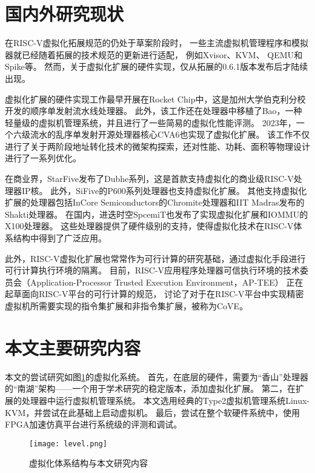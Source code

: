 \section{国内外研究现状}
在RISC-V虚拟化拓展规范的仍处于草案阶段时，
一些主流虚拟机管理程序和模拟器就已经随着拓展的技术规范的更新进行适配，
例如Xvisor\cite{pdp2015xvisor}、KVM\cite{kvm:H-ext}、
QEMU\cite{qemu-riscv:H-ext}和Spike\cite{github:spike}等。
然而，关于虚拟化扩展的硬件实现，仅从拓展的0.6.1版本发布后才陆续出现。

虚拟化扩展的硬件实现工作最早开展在Rocket Chip\cite{itco2022rocket}中，这是加州大学伯克利分校开发的顺序单发射流水线处理器。
此外，该工作还在处理器中移植了Bao，一种轻量级的虚拟机管理系统\cite{ng-res2020bao}，并且进行了一些简易的虚拟化性能评测。
2023年，一个六级流水的乱序单发射开源处理器核心CVA6\cite{tvlsi2023cva6}也实现了虚拟化扩展。
该工作不仅进行了关于两阶段地址转化技术的微架构探索，还对性能、功耗、面积等物理设计进行了一系列优化。

在商业界，StarFive发布了Dubhe系列，这是首款支持虚拟化的商业级RISC-V处理器IP核。
此外，SiFive的P600系列处理器也支持虚拟化扩展。
其他支持虚拟化扩展的处理器包括InCore Semiconductors的Chromite处理器和IIT Madras发布的Shakti处理器。
在国内，进迭时空SpcemiT也发布了实现虚拟化扩展和IOMMU的X100处理器。
这些处理器提供了硬件级别的支持，使得虚拟化技术在RISC-V体系结构中得到了广泛应用。

此外，RISC-V虚拟化扩展也常常作为可行计算的研究基础，通过虚拟化手段进行可行计算执行环境的隔离。
目前，RISC-V应用程序处理器可信执行环境的技术委员会（Application-Processor Trusted Execution Environment，AP-TEE）
正在起草面向RISC-V平台的可行计算的规范，
讨论了对于在RISC-V平台中实现精密虚拟机所需要实现的指令集扩展和非指令集扩展，被称为CoVE\cite{sahita2023cove}。

\section{本文主要研究内容}
本文的尝试研究如图\ref{fig:level}的虚拟化系统。
首先，在底层的硬件，需要为“香山”处理器的“南湖”架构——一个用于学术研究的稳定版本，添加虚拟化扩展。
第二，在扩展的处理器中运行虚拟机管理系统。
本文选用经典的Type2虚拟机管理系统Linux-KVM\cite{kvm:H-ext}，并尝试在此基础上启动虚拟机。
最后，尝试在整个软硬件系统中，使用FPGA加速仿真平台进行系统级的评测和调试。

\begin{figure}[htbp]
    \centering
    \texttt{[image: level.png]}
    \caption{虚拟化体系结构与本文研究内容}
    \label{fig:level}
\end{figure}

